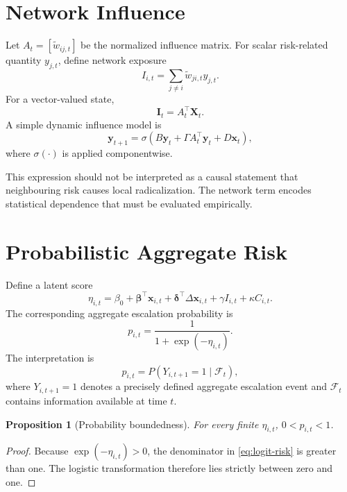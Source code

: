\documentclass[11pt,letterpaper]{article}
\newtheorem{proposition}{Proposition}
\begin{document}
\section{Network Influence}
Let $A_t=[\widetilde w_{ij,t}]$ be the normalized influence matrix. For scalar risk-related quantity $y_{j,t}$, define network exposure
\begin{equation}
I_{i,t}=\sum_{j\neq i}\widetilde w_{ji,t}y_{j,t}.
\label{eq:network-exposure}
\end{equation}
For a vector-valued state,
\begin{equation}
\mathbf{I}_t=A_t^{\top}\mathbf{X}_t.
\end{equation}
A simple dynamic influence model is
\begin{equation}
\mathbf{y}_{t+1}=\sigma\left(B\mathbf{y}_t+\Gamma A_t^{\top}\mathbf{y}_t+D\mathbf{x}_t\right),
\end{equation}
where $\sigma(\cdot)$ is applied componentwise.

This expression should not be interpreted as a causal statement that neighbouring risk causes local radicalization. The network term encodes statistical dependence that must be evaluated empirically.

\section{Probabilistic Aggregate Risk}
Define a latent score
\begin{equation}
\eta_{i,t}=\beta_0+\boldsymbol{\beta}^{\top}\mathbf{x}_{i,t}+\boldsymbol{\delta}^{\top}\Delta\mathbf{x}_{i,t}+\gamma I_{i,t}+\kappa C_{i,t}.
\end{equation}
The corresponding aggregate escalation probability is
\begin{equation}
p_{i,t}=\frac{1}{1+\exp(-\eta_{i,t})}.
\label{eq:logit-risk}
\end{equation}
The interpretation is
\begin{equation}
p_{i,t}=P(Y_{i,t+1}=1\mid\mathcal{F}_t),
\end{equation}
where $Y_{i,t+1}=1$ denotes a precisely defined aggregate escalation event and $\mathcal{F}_t$ contains information available at time $t$.

\begin{proposition}[Probability boundedness]
For every finite $\eta_{i,t}$, $0<p_{i,t}<1$.
\end{proposition}
\begin{proof}
Because $\exp(-\eta_{i,t})>0$, the denominator in \cref{eq:logit-risk} is greater than one. The logistic transformation therefore lies strictly between zero and one.
\end{proof}
\end{document}
